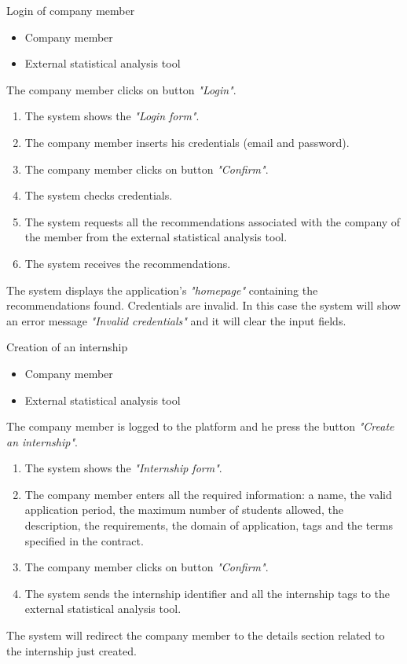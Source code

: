 \usecase
{Login of company member}
{
    \begin{itemize}
        \item Company member
        \item External statistical analysis tool
    \end{itemize}
}
{
    The company member clicks on button \textit{"Login"}.
}
{
    \begin{enumerate}
        \item The system shows the \textit{"Login form"}.
        \item The company member inserts his credentials (email and password).
        \item The company member clicks on button \textit{"Confirm"}.
        \item The system checks credentials.
        \item The system requests all the recommendations associated with the company of the member from the external statistical analysis tool.
        \item The system receives the recommendations.
    \end{enumerate}
}
{
    The system displays the application's \textit{"homepage"} containing the recommendations found.
}
{
    Credentials are invalid. In this case the system will show an error message \textit{"Invalid credentials"} and it will clear the input fields.
}
{

}

\usecase
{Creation of an internship}
{
    \begin{itemize}
        \item Company member
        \item External statistical analysis tool
    \end{itemize}
}
{
    The company member is logged to the platform and he press the button \textit{"Create an internship"}.
}
{
    \begin{enumerate}
        \item The system shows the \textit{"Internship form"}.
        \item The company member enters all the required information: a name, the valid application period, the maximum number of students allowed, the description, the requirements, the domain of application, tags and the terms specified in the contract.
        \item The company member clicks on button \textit{"Confirm"}.
        \item The system sends the internship identifier and all the internship tags to the external statistical analysis tool.
    \end{enumerate}
}
{
    The system will redirect the company member to the details section related to the internship just created.
}
{

}
{

}

